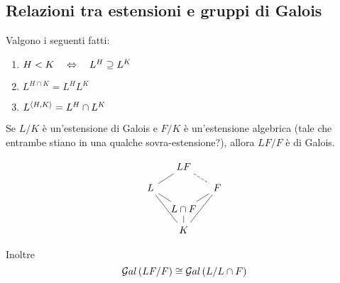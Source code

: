 \subsection{Relazioni tra estensioni e gruppi di Galois}
\begin{multicols}{2}
	\begin{prop}
		Valgono i seguenti fatti:
		\begin{enumerate}
			\item  $ H < K \quad\Leftrightarrow\quad L^H \supseteq L^K $
			\item $ L^{H \cap K} = L^H L^K $
			\item $ L^{\langle H, K \rangle} = L^H \cap L^K $
		\end{enumerate}
		
	\end{prop}
	
	\begin{theorem}\label{galrandom}
		Se $ L/K $ è un'estensione di Galois e $ F/K $ è un'estensione algebrica (tale che entrambe stiano in una qualche sovra-estensione?), allora $ LF/F $ è di Galois. 
		
		\[\begin{tikzcd}[row sep=0.25cm, column sep=0.3cm]
		 & LF \arrow[dl,-] \arrow[dr,-, dashed] &  \\
		L \arrow[ddr,-] \arrow[dr,-] &  & F \arrow [ddl,-] \\
		& L\cap F \arrow[ur,-] \arrow[d,-]  & \\
		& K &
		\end{tikzcd} \]
		
		Inoltre
		\[ \mathcal{G}al\left( LF/F \right) \cong \mathcal{G}al\left( L / L\cap F \right) \]
	\end{theorem}
	

\end{multicols}
